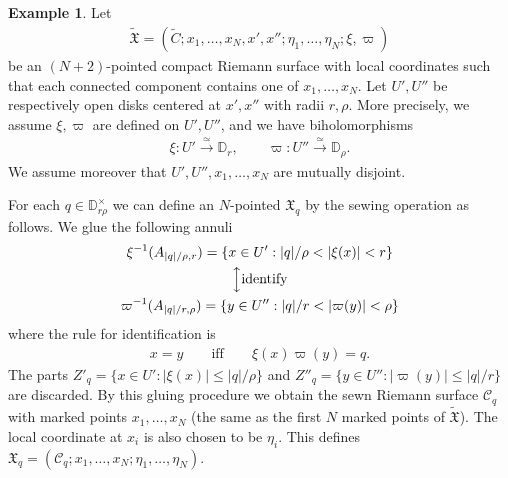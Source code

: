 \documentclass[12pt,a4paper,notitlepage]{article}
\theoremstyle{definition}
\newtheorem{eg}[df]{Example}
\theoremstyle{plain}
\newcommand{\fk}{\mathfrak}
\newcommand{\mc}{\mathcal}
\newcommand{\wtd}{\widetilde}
\newcommand{\Dbb}{\mathbb D}
\numberwithin{equation}{section}
\begin{document}
\subsection{}\label{lb170}


\begin{eg}\label{lb154}
Let
\begin{align*}
\wtd{\fk X}=(\wtd C;x_1,\dots,x_N,x',x'';\eta_1,\dots,\eta_N;\xi,\varpi)
\end{align*}
be an $(N+2)$-pointed compact Riemann surface with local coordinates such that each connected component contains one of $x_1,\dots,x_N$. Let $U',U''$ be respectively open  disks centered at $x',x''$ with radii $r,\rho$. More precisely, we assume $\xi,\varpi$ are defined on $U',U''$, and we have biholomorphisms
\begin{align*}
\xi:U'\xrightarrow{\simeq}\Dbb_r,\qquad \varpi:U''\xrightarrow{\simeq} \Dbb_\rho.
\end{align*}
We assume moreover that $U',U'',x_1,\dots,x_N$ are mutually disjoint.

For each $q\in\Dbb^\times_{r\rho}$ we can define an $N$-pointed $\fk X_q$ by the sewing operation as follows. We glue the following annuli
\begin{gather}
	\begin{gathered}
\xi^{-1}(A_{|q|/\rho,r})=\{x\in U': |q|/\rho<|\xi(x)|<r\}\\
\Big\updownarrow\text{identify}\\	
\varpi^{-1}(A_{|q|/r,\rho})=\{y\in U'':|q|/r<|\varpi(y)|<\rho\}
	\end{gathered}	
\end{gather}
where the rule for identification is
\begin{align}
x=y\qquad\text{iff}\qquad\xi(x)\varpi(y)=q.
\end{align}
The parts $Z'_q=\{x\in U':|\xi(x)|\leq |q|/\rho\}$ and $Z''_q=\{y\in U'':|\varpi(y)|\leq |q|/r\}$ are discarded. By this gluing procedure we obtain the sewn Riemann surface $\mc C_q$ with marked points $x_1,\dots,x_N$ (the same as the first $N$ marked points of $\wtd{\fk X}$). The local coordinate at $x_i$ is also chosen to be $\eta_i$. This defines $\fk X_q=(\mc C_q;x_1,\dots,x_N;\eta_1,\dots,\eta_N)$.


\end{eg}
\end{document}
